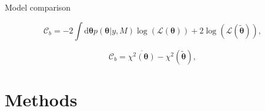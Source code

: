 \documentclass[11pt,aspectratio=1610,dvipsnames]{beamer}
\begin{document}
\begin{frame}{Model comparison}

	\begin{tcolorbox}[colback=black!5,colframe=gray!15!black,title=\textsc{Bayesian} complexity] 
		\begin{equation}\label{eq:Bayes_Complexity}
			\mathcal{C}_b=-2\int \text{d}\boldsymbol{\theta} p(\boldsymbol{\theta}|y,M)\log(\mathcal{L}(\boldsymbol{\theta}))+2\log(\mathcal{L}(\boldsymbol{\tilde{\theta}})),
		\end{equation}
	
		\begin{equation}\label{eq:Bayes_Complexity_alt}
		\mathcal{C}_b=\overline{\chi^2(\boldsymbol{\theta})}-\chi^2(\boldsymbol{\tilde{\theta}}),
	\end{equation}
	\end{tcolorbox}
\end{frame}

\section{Methods}
\end{document}
